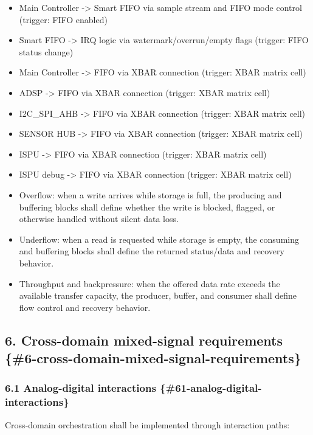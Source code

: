 \documentclass[11pt]{article}
\begin{document}
\begin{itemize}
\item Main Controller -> Smart FIFO via sample stream and FIFO mode control (trigger: FIFO enabled)
\item Smart FIFO -> IRQ logic via watermark/overrun/empty flags (trigger: FIFO status change)
\item Main Controller -> FIFO via XBAR connection (trigger: XBAR matrix cell)
\item ADSP -> FIFO via XBAR connection (trigger: XBAR matrix cell)
\item I2C\_SPI\_AHB -> FIFO via XBAR connection (trigger: XBAR matrix cell)
\item SENSOR HUB -> FIFO via XBAR connection (trigger: XBAR matrix cell)
\item ISPU -> FIFO via XBAR connection (trigger: XBAR matrix cell)
\item ISPU debug -> FIFO via XBAR connection (trigger: XBAR matrix cell)
\item Overflow: when a write arrives while storage is full, the producing and buffering blocks shall define whether the write is blocked, flagged, or otherwise handled without silent data loss.
\item Underflow: when a read is requested while storage is empty, the consuming and buffering blocks shall define the returned status/data and recovery behavior.
\item Throughput and backpressure: when the offered data rate exceeds the available transfer capacity, the producer, buffer, and consumer shall define flow control and recovery behavior.
\end{itemize}

\subsection{6. Cross-domain mixed-signal requirements \{\#6-cross-domain-mixed-signal-requirements\}}


\subsubsection{6.1 Analog-digital interactions \{\#61-analog-digital-interactions\}}


Cross-domain orchestration shall be implemented through interaction paths:
\end{document}
